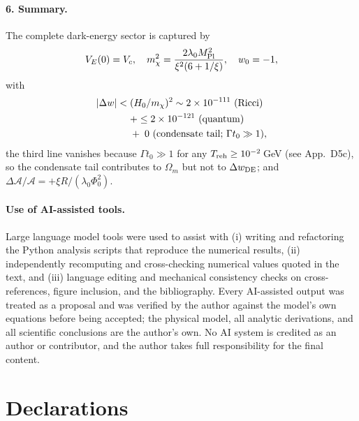 \documentclass[pdflatex,sn-mathphys-num]{sn-jnl}
\providecommand{\gtrsim}{\geq}
\newcommand{\MP}{M_{\rm Pl}}
\newcommand{\PhiV}{\Phi_0}
\theoremstyle{thmstyleone}
\begin{document}
\begin{appendices}
\paragraph{6. Summary.} The complete dark-energy sector is captured by
\begin{equation}
V_E(0)=V_c,\quad
m_\chi^2=\frac{2\lambda_0\MP^2}{\xi^2(6+1/\xi)},\quad
w_0=-1,
\end{equation}
with
\begin{equation}
\begin{aligned}
|\Delta w|<{}&(H_0/m_\chi)^2\sim2\times10^{-111}\ ({\rm Ricci})\\
&+\leq2\times10^{-121}\ ({\rm quantum})\\
&+\;0\ ({\rm condensate\ tail;\ }\Gamma t_0\gg1),
\end{aligned}
\end{equation}
the third line vanishes because $\Gamma t_0\gg1$ for any $T_{\rm reh}\gtrsim10^{-2}\,$GeV (see App.~D5c), so the condensate tail contributes to $\Omega_m$ but not to $\Delta w_{\rm DE}$; and $\Delta\mathcal{A}/\mathcal{A}=+\xi R/(\lambda_0\PhiV^2)$.

\end{appendices}


 \paragraph{Use of AI-assisted tools.} Large language model tools were used to assist with (i) writing and refactoring the Python analysis scripts that reproduce the numerical results, (ii) independently recomputing and cross-checking numerical values quoted in the text, and (iii) language editing and mechanical consistency checks on cross-references, figure inclusion, and the bibliography. Every AI-assisted output was treated as a proposal and was verified by the author against the model's own equations before being accepted; the physical model, all analytic derivations, and all scientific conclusions are the author's own. No AI system is credited as an author or contributor, and the author takes full responsibility for the final content.

\section*{Declarations}
\end{document}
